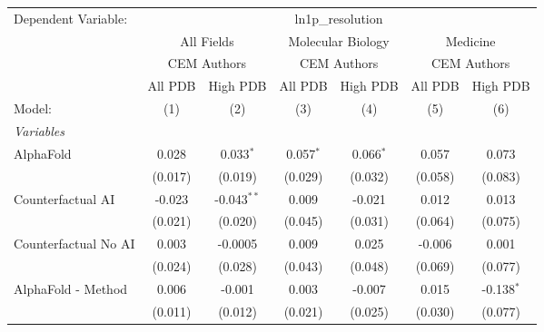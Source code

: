 \begingroup
\centering
\begin{tabular}{lcccccc}
   \tabularnewline \midrule \midrule
   Dependent Variable: & \multicolumn{6}{c}{ln1p\_resolution}\\
 & \multicolumn{2}{c}{All Fields} & \multicolumn{2}{c}{Molecular Biology} & \multicolumn{2}{c}{Medicine} \\
\cmidrule(lr){2-3} \cmidrule(lr){4-5} \cmidrule(lr){6-7}
 & \multicolumn{2}{c}{CEM Authors} & \multicolumn{2}{c}{CEM Authors} & \multicolumn{2}{c}{CEM Authors} \\
\cmidrule(lr){2-3} \cmidrule(lr){4-5} \cmidrule(lr){6-7}
 & \multicolumn{1}{c}{All PDB} & \multicolumn{1}{c}{High PDB} & \multicolumn{1}{c}{All PDB} & \multicolumn{1}{c}{High PDB} & \multicolumn{1}{c}{All PDB} & \multicolumn{1}{c}{High PDB} \\
\cmidrule(lr){2-2} \cmidrule(lr){3-3} \cmidrule(lr){4-4} \cmidrule(lr){5-5} \cmidrule(lr){6-6} \cmidrule(lr){7-7}
   Model:                                                     & (1)          & (2)           & (3)           & (4)           & (5)     & (6)\\  
   \midrule
   \emph{Variables}\\
   AlphaFold                                                  & 0.028        & 0.033$^{*}$   & 0.057$^{*}$   & 0.066$^{*}$   & 0.057   & 0.073\\   
                                                              & (0.017)      & (0.019)       & (0.029)       & (0.032)       & (0.058) & (0.083)\\   
   Counterfactual AI                                          & -0.023       & -0.043$^{**}$ & 0.009         & -0.021        & 0.012   & 0.013\\   
                                                              & (0.021)      & (0.020)       & (0.045)       & (0.031)       & (0.064) & (0.075)\\   
   Counterfactual No AI                                       & 0.003        & -0.0005       & 0.009         & 0.025         & -0.006  & 0.001\\   
                                                              & (0.024)      & (0.028)       & (0.043)       & (0.048)       & (0.069) & (0.077)\\   
   AlphaFold - Method                                         & 0.006        & -0.001        & 0.003         & -0.007        & 0.015   & -0.138$^{*}$\\   
                                                              & (0.011)      & (0.012)       & (0.021)       & (0.025)       & (0.030) & (0.077)\\   

\end{tabular}
